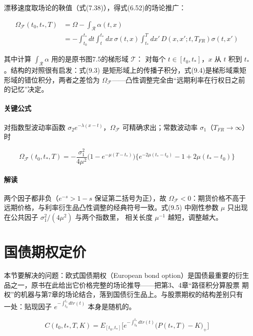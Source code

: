 漂移速度取场论的鞅值（式(7.38)），得式(6.52)的场论推广：

\begin{align*}
\Omega_{\mathcal{F}}(t_0,t_*,T)&=\Omega-\int_{\mathcal{R}}\alpha(t,x)\\
&=-\int_{t_0}^{t_*}dt\int_{t}^{t_*}dx\,\sigma(t,x)\int_{t_*}^{T}dx'\,
D(x,x';t,T_{FR})\sigma(t,x')\tag{9.4}
\end{align*}

其中计算 $\int_{\mathcal{R}}\alpha$ 用的是原书图7.5的梯形域 $\mathcal{T}$：
对每个 $t\in[t_0,t_*]$，$x$ 从 $t$ 积到 $t_*$。结构的对照很有启发：式(9.3)
是矩形域上的传播子积分，式(9.4)是梯形域乘矩形域的错位积分，两者之差恰为
$\Omega_{\mathcal{F}}$——凸性调整完全由“远期利率在行权日之前的记忆”决定。

\paragraph{关键公式}
对指数型波动率函数 $\sigma_2e^{-\lambda(x-t)}$，$\Omega_{\mathcal{F}}$
可精确求出；常数波动率 $\sigma_1$（$T_{FR}\to\infty$）时

\begin{equation*}
\Omega_{\mathcal{F}}(t_0,t_*,T)=-\frac{\sigma_1^{2}}{4\mu^{2}}
\bigl(1-e^{-\mu(T-t_*)}\bigr)
\bigl\{e^{-2\mu(t_*-t_0)}-1+2\mu(t_*-t_0)\bigr\}\tag{9.5}
\end{equation*}

\paragraph{解读}
两个因子都非负（$e^{-s}>1-s$ 保证第二括号为正），故 $\Omega_{\mathcal{F}}
<0$：期货价格不高于远期价格，与利率衍生品凸性调整的经典符号一致。式(9.5)
中刚性参数 $\mu$ 只出现在公共因子 $\sigma_1^{2}/(4\mu^{2})$ 与两个指数里，
相关长度 $\mu^{-1}$ 越短，调整越大。

\section{国债期权定价}

本节要解决的问题：欧式国债期权（European bond option）是国债最重要的衍生
品之一，原书在此给出它价格完整的场论推导——把第3、4章“路径积分算股票
期权”的机器与第7章的场论结合，落到国债衍生品上。与股票期权的结构差别只有
一处：贴现因子 $e^{-\int_{t_0}^{t_*}dtr(t)}$ 本身是随机的。

\begin{equation*}
C(t_0,t_*,T,K)=E_{[t_0,t_*]}\biggl[e^{-\int_{t_0}^{t_*}dtr(t)}
\bigl(P(t_*,T)-K\bigr)_{+}\biggr]\tag{9.6}
\end{equation*}

